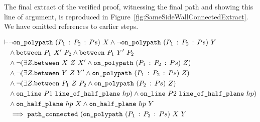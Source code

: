 The final extract of the verified proof, witnessing the final path and showing this line of argument, is reproduced in Figure~\ref{fig:SameSideWallConnectedExtract}. We have omitted references to earlier steps.

\begin{equation}
  \label{eq:SameSideWallConnected}
  \begin{split}
\vdash &\neg\texttt{on\_polypath}\ (P_1\,:\,P_2\,:\,Ps)\ X \wedge\neg\texttt{on\_polypath}\ (P_1\,:\,P_2\,:\,Ps)\ Y\\
    &\wedge\texttt{between}\ P_1\ X'\ P_2\wedge\texttt{between}\ P_1\ Y'\ P_2\\
    &\wedge\neg(\exists Z. \texttt{between}\ X\ Z\ X' \wedge \texttt{on\_polypath}\ (P_1\,:\,P_2\,:\,Ps)\ Z)\\
    &\wedge\neg(\exists Z. \texttt{between}\ Y\ Z\ Y' \wedge \texttt{on\_polypath}\ (P_1\,:\,P_2\,:\,Ps)\ Z)\\
    &\wedge\neg(\exists Z. \texttt{between}\ P_1\ Z\ P_2 \wedge \texttt{on\_polypath}\ (P_2\,:\,Ps)\ Z)\\
    &\wedge \texttt{on\_line}\ P1\ \texttt{line\_of\_half\_plane}\ hp) \wedge \texttt{on\_line}\ P2\ \texttt{line\_of\_half\_plane}\ hp)\\
    &\wedge \texttt{on\_half\_plane}\ hp\ X \wedge \texttt{on\_half\_plane}\ hp\ Y\\
    &\implies \texttt{path\_connected}\ (\texttt{on\_polypath}\ (P_1\,:\,P_2\,:\,Ps)\ X\ Y
  \end{split}
\end{equation}

